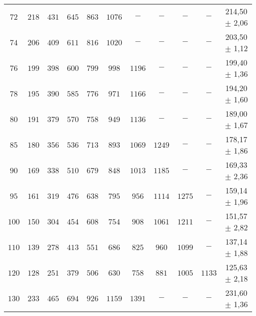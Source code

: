 \begin{table}[H]
\begin{tabular}{c c c c c c c c c c | S[table-format=3.2]}
        $72$ &  $218$ & $431$ &$ 645$  & $863 $ & $1076 $ & $-   $ & $-   $ & $-   $ &  $-   $ &   {214,50 $\pm$ 2,06}  \\
        $74$ &  $206$ & $409$ &$ 611$  & $816 $ & $1020 $ & $-   $ & $-   $ & $-   $ &  $-   $ &   {203,50 $\pm$ 1,12}  \\
        $76$ &  $199$ & $398$ &$ 600$  & $799 $ & $998  $ & $1196$ & $-   $ & $-   $ &  $-   $ &   {199,40 $\pm$ 1,36}  \\ 
        $78$ &  $195$ & $390$ &$ 585$  & $776 $ & $971  $ & $1166$ & $-   $ & $-   $ &  $-   $ &   {194,20 $\pm$ 1,60}  \\ 
        $80$ &  $191$ & $379$ &$ 570$  & $758 $ & $949  $ & $1136$ & $-   $ & $-   $ &  $-   $ &   {189,00 $\pm$ 1,67}  \\ 
        $85$ &  $180$ & $356$ &$ 536$  & $713 $ & $893  $ & $1069$ & $1249$ & $-   $ &  $-   $ &   {178,17 $\pm$ 1,86}  \\ 
        $90$ &  $169$ & $338$ &$ 510$  & $679 $ & $848  $ & $1013$ & $1185$ & $-   $ &  $-   $ &   {169,33 $\pm$ 2,36}  \\ 
        $95$ &  $161$ & $319$ &$ 476$  & $638 $ & $795  $ & $956 $ & $1114$ & $1275$ &  $-   $ &   {159,14 $\pm$ 1,96}  \\ 
        $100$ & $150$ & $304$ &$ 454$  & $608 $ & $754  $ & $908 $ & $1061$ & $1211$ &  $-   $ &   {151,57 $\pm$ 2,82}  \\ 
        $110$ & $139$ & $278$ &$ 413$  & $551 $ & $686  $ & $825 $ & $960 $ & $1099$ &  $-   $ &   {137,14 $\pm$ 1,88}  \\ 
        $120$ & $128$ & $251$ &$ 379$  & $506 $ & $630  $ & $758 $ & $881 $ & $1005$ &  $1133$ &   {125,63 $\pm$ 2,18}  \\
        $130$ & $233$ & $465$ &$ 694$  & $926 $ & $1159 $ & $1391$ & $-   $ & $-   $ &  $-   $ &   {231,60 $\pm$ 1,36}  \\ 
    \bottomrule
    \end{tabular}
    \end{table}